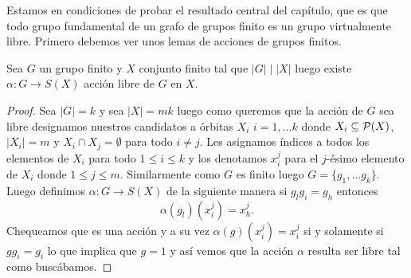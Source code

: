 \documentclass[tesis.tex]{subfiles}
\begin{document}
%	


Estamos en condiciones de probar el resultado central del capítulo, que es que todo grupo fundamental de un grafo de grupos finito es un grupo virtualmente libre.
Primero debemos ver unos lemas de acciones de grupos finitos.

\begin{lema}\label{lema_accion_orden}
	Sea $G$ un grupo finito y $X$ conjunto finito tal que $|G| \mid |X|$ luego existe $\alpha: G \to S(X)$ acción libre de $G$ en $X$.
\end{lema}

\begin{proof}
	Sea $|G|=k$ y sea $|X|=mk$ luego como queremos que la acción de $G$ sea libre designamos nuestros candidatos a órbitas $X_{i}$ $i=1, \dots k$ donde $X_{i} \subseteq {\cal P}(X)$, $|X_{i}|=m$ y $X_{i} \cap X_{j} = \emptyset$ para todo $i \neq j$.
	Les asignamos índices a todos los elementos de $X_{i}$ para todo $ 1 \le i \le k$ y los denotamos $x_{i}^j$ para el $j$-ésimo elemento de $X_{i}$ donde $1 \le j \le m$.
	Similarmente como $G$ es finito luego $G = \{ g_{1}, \dots g_{k} \}$.
	Luego definimos $\alpha:G \to S(X)$ de la siguiente manera si $g_{l} g_{i} = g_{h}$ entonces
	\[
		\alpha(g_{l})(x_{i}^j) = x_{h}^j.
	\] 
	Chequeamos que es una acción y a su vez $\alpha(g)(x_{i}^j) = x_{i}^j$ si y solamente si $g g_{i} = g_{i}$ lo que implica que $g = 1$ y así vemos que la acción $\alpha$ resulta ser libre tal como buscábamos.
\end{proof}
\end{document}
